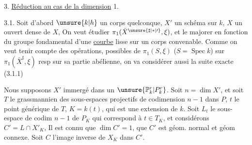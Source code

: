 3. \uline{Réduction au cas de la dimension} 1.

3.1.  Soit d'abord $\unsure{k|h}$ un  corps quelconque, $X'$ un schéma   sur $k$, $X$ un ouvert dense de $X$,   On veut étudier $\pi_1(\bar X^{\unsure{\sharp|*|\prime}},\xi)$, et  le majorer en fonction du groupe fondamental d'une \uline{courbe} lisse sur un corps convenable.
Comme on veut tenir compte des opérations, possibles de $\pi_1(S,\xi)$ ($S=\operatorname{Spec}k$) sur $\pi_1(\bar X^\sharp,\xi)$ resp sur sa partie abélienne, on va considérer aussi la suite exacte
\noindent (3.1.1)

 Nous supposons  $X'$ immergé dans un $\unsure{\mathbb P^r_k|P^r_k}$.  Soit $n=\dim X'$, et soit $T$ le grassmannien des sous-espaces projectifs de codimension $n-1$  dans $P$,  $t$ le point générique de $T$, $K=k(t)$, qui est une extension   de $k$.  Soit $L_t$ le sous-espace  de codim $n-1$  de $P_K$ qui correspond à $t\in T_K$, et considérons $C'=L\cap X'_K$,  Il est connu que $\dim C'=1$, que $C'$ est géom. normal et géom connexe. Soit $C$ l'image inverse de $X_K$ dans $C'$.
